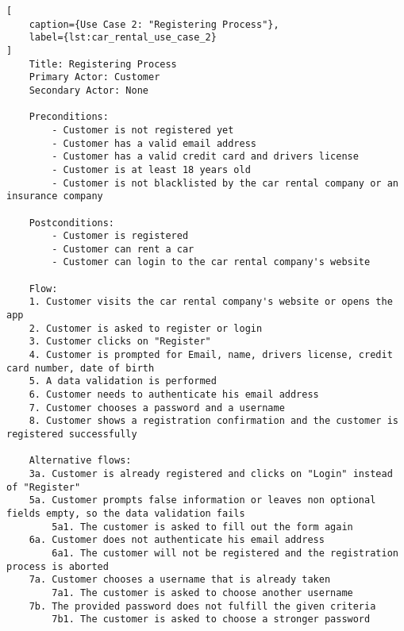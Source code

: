 \begin{lstlisting}[
    caption={Use Case 2: "Registering Process"},
    label={lst:car_rental_use_case_2}
]
    Title: Registering Process
    Primary Actor: Customer
    Secondary Actor: None

    Preconditions:
        - Customer is not registered yet
        - Customer has a valid email address
        - Customer has a valid credit card and drivers license
        - Customer is at least 18 years old
        - Customer is not blacklisted by the car rental company or an insurance company

    Postconditions:
        - Customer is registered
        - Customer can rent a car
        - Customer can login to the car rental company's website

    Flow:
    1. Customer visits the car rental company's website or opens the app 
    2. Customer is asked to register or login
    3. Customer clicks on "Register"
    4. Customer is prompted for Email, name, drivers license, credit card number, date of birth
    5. A data validation is performed
    6. Customer needs to authenticate his email address
    7. Customer chooses a password and a username
    8. Customer shows a registration confirmation and the customer is registered successfully 

    Alternative flows:
    3a. Customer is already registered and clicks on "Login" instead of "Register"
    5a. Customer prompts false information or leaves non optional fields empty, so the data validation fails
        5a1. The customer is asked to fill out the form again
    6a. Customer does not authenticate his email address
        6a1. The customer will not be registered and the registration process is aborted
    7a. Customer chooses a username that is already taken
        7a1. The customer is asked to choose another username
    7b. The provided password does not fulfill the given criteria
        7b1. The customer is asked to choose a stronger password
\end{lstlisting}

